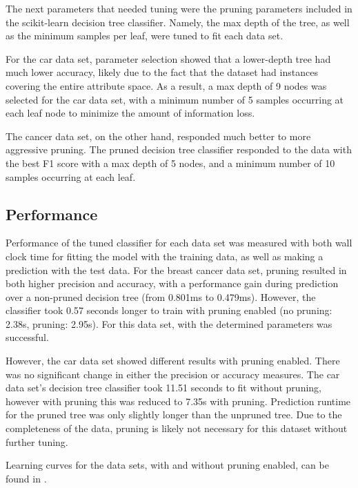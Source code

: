 \documentclass{article}
\begin{document}
    The next parameters that needed tuning were the pruning parameters included in the scikit-learn decision tree classifier. Namely, the max depth of the tree, as well as the minimum samples per leaf, were tuned to fit each data set.

    For the car data set, parameter selection showed that a lower-depth tree had much lower accuracy, likely due to the fact that the dataset had instances covering the entire attribute space. As a result, a max depth of 9 nodes was selected for the car data set, with a minimum number of 5 samples occurring at each leaf node to minimize the amount of information loss.

    The cancer data set, on the other hand, responded much better to more aggressive pruning. The pruned decision tree classifier responded to the data with the best F1 score with a max depth of 5 nodes, and a minimum number of 10 samples occurring at each leaf.

    \subsection{Performance}
    Performance of the tuned classifier for each data set was measured with both wall clock time for fitting the model with the training data, as well as making a prediction with the test data. For the breast cancer data set, pruning resulted in both higher precision and accuracy, with a performance gain during prediction over a non-pruned decision tree (from 0.801ms to 0.479ms). However, the classifier took 0.57 seconds longer to train with pruning enabled (no pruning: 2.38s, pruning: 2.95s). For this data set, with the determined parameters was successful.

    However, the car data set showed different results with pruning enabled. There was no significant change in either the precision or accuracy measures. The car data set's decision tree classifier took 11.51 seconds to fit without pruning, however with pruning this was reduced to 7.35s with pruning. Prediction runtime for the pruned tree was only slightly longer than the unpruned tree. Due to the completeness of the data, pruning is likely not necessary for this dataset without further tuning.

    Learning curves for the data sets, with and without pruning enabled, can be found in .
\end{document}
